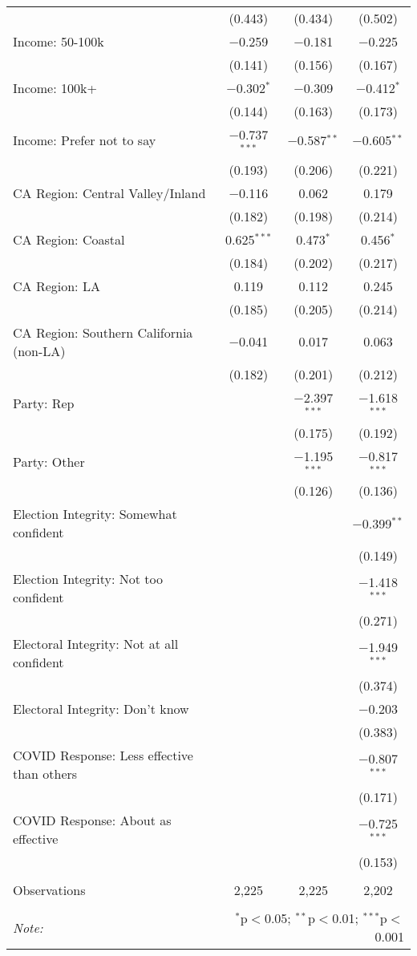 \begin{table}[!htbp]
\begin{tabular}{@{\extracolsep{5pt}}lccc}
  & (0.443) & (0.434) & (0.502) \\ 
  Income: 50-100k & $-$0.259 & $-$0.181 & $-$0.225 \\ 
  & (0.141) & (0.156) & (0.167) \\ 
  Income: 100k+ & $-$0.302$^{*}$ & $-$0.309 & $-$0.412$^{*}$ \\ 
  & (0.144) & (0.163) & (0.173) \\ 
  Income: Prefer not to say & $-$0.737$^{***}$ & $-$0.587$^{**}$ & $-$0.605$^{**}$ \\ 
  & (0.193) & (0.206) & (0.221) \\ 
  CA Region: Central Valley/Inland & $-$0.116 & 0.062 & 0.179 \\ 
  & (0.182) & (0.198) & (0.214) \\ 
  CA Region: Coastal & 0.625$^{***}$ & 0.473$^{*}$ & 0.456$^{*}$ \\ 
  & (0.184) & (0.202) & (0.217) \\ 
  CA Region: LA & 0.119 & 0.112 & 0.245 \\ 
  & (0.185) & (0.205) & (0.214) \\ 
  CA Region: Southern California (non-LA) & $-$0.041 & 0.017 & 0.063 \\ 
  & (0.182) & (0.201) & (0.212) \\ 
  Party: Rep &  & $-$2.397$^{***}$ & $-$1.618$^{***}$ \\ 
  &  & (0.175) & (0.192) \\ 
  Party: Other &  & $-$1.195$^{***}$ & $-$0.817$^{***}$ \\ 
  &  & (0.126) & (0.136) \\ 
  Election Integrity: Somewhat confident &  &  & $-$0.399$^{**}$ \\ 
  &  &  & (0.149) \\ 
  Election Integrity: Not too confident &  &  & $-$1.418$^{***}$ \\ 
  &  &  & (0.271) \\ 
  Electoral Integrity: Not at all confident &  &  & $-$1.949$^{***}$ \\ 
  &  &  & (0.374) \\ 
  Electoral Integrity: Don't know &  &  & $-$0.203 \\ 
  &  &  & (0.383) \\ 
  COVID Response: Less effective than others &  &  & $-$0.807$^{***}$ \\ 
  &  &  & (0.171) \\ 
  COVID Response: About as effective &  &  & $-$0.725$^{***}$ \\ 
  &  &  & (0.153) \\ 
 \hline \\[-1.8ex] 
Observations & 2,225 & 2,225 & 2,202 \\ 
\hline 
\hline \\[-1.8ex] 
\textit{Note:}  & \multicolumn{3}{r}{$^{*}$p$<$0.05; $^{**}$p$<$0.01; $^{***}$p$<$0.001} \\ 
\end{tabular} 
\end{table} 
